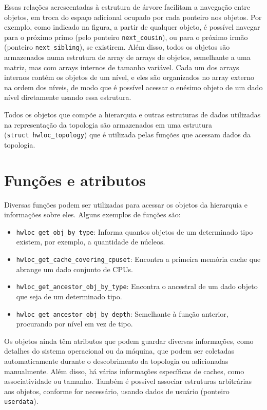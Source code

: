 Essas relações acrescentadas à estrutura de árvore facilitam a navegação entre objetos, em troca do espaço adicional ocupado por cada ponteiro nos objetos.
Por exemplo, como indicado na figura, a partir de qualquer objeto, é possível navegar para o próximo primo (pelo ponteiro \texttt{next\_cousin}), ou para o próximo irmão (ponteiro \texttt{next\_sibling}), se existirem.
Além disso, todos os objetos são armazenados numa estrutura de array de arrays de objetos, semelhante a uma matriz, mas com arrays internos de tamanho variável.
Cada um dos arrays internos contém os objetos de um nível, e eles são organizados no array externo na ordem dos níveis, de modo que é possível acessar o enésimo objeto de um dado nível diretamente usando essa estrutura.

Todos os objetos que compõe a hierarquia e outras estruturas de dados utilizadas na representação da topologia são armazenados em uma estrutura (\texttt{struct~hwloc\_topology}) que é utilizada pelas funções que acessam dados da topologia.


\section{Funções e atributos}

Diversas funções podem ser utilizadas para acessar os objetos da hierarquia e informações sobre eles.
Alguns exemplos de funções são:
\begin{itemize}
	\item \texttt{hwloc\_get\_obj\_by\_type}: Informa quantos objetos de um determinado tipo existem, por exemplo, a quantidade de núcleos.
	\item \texttt{hwloc\_get\_cache\_covering\_cpuset}: Encontra a primeira memória cache que abrange um dado conjunto de CPUs.
	\item \texttt{hwloc\_get\_ancestor\_obj\_by\_type}: Encontra o ancestral de um dado objeto que seja de um determinado tipo.
	\item \texttt{\texttt{hwloc\_get\_ancestor\_obj\_by\_depth}}: Semelhante à função anterior, procurando por nível em vez de tipo.
\end{itemize}

Os objetos ainda têm atributos que podem guardar diversas informações, como detalhes do sistema operacional ou da máquina, que podem ser coletadas automaticamente durante o descobrimento da topologia ou adicionadas manualmente.
Além disso, há várias informações específicas de caches, como associatividade ou tamanho.
Também é possível associar estruturas arbitrárias aos objetos, conforme for necessário, usando dados de usuário (ponteiro \texttt{userdata}).


